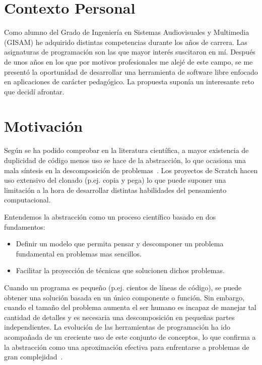 \documentclass[a4paper, 12pt]{book}
\begin{document}
\section{Contexto Personal}
\label{sec:contexto}

Como alumno del Grado de Ingeniería en Sistemas Audiovisuales y Multimedia (GISAM) he adquirido distintas competencias durante los años de carrera. Las asignaturas de programación son las que mayor interés suscitaron en mí. Después de unos años en los que por motivos profesionales me alejé de este campo, se me presentó la oportunidad de desarrollar una herramienta de software libre enfocado en aplicaciones de carácter pedagógico. La propuesta suponía un interesante reto que decidí afrontar. 

\section{Motivación}
\label{sec:motivacion}

Según se ha podido comprobar en la literatura científica, a mayor existencia de duplicidad de código menos uso se hace de la abstracción, lo que ocasiona una mala síntesis en la descomposición de problemas~\cite{baxter_yahin}. Los proyectos de Scratch hacen uso extensivo del clonado (p.ej. copia y pega) lo que puede suponer una limitación a la hora de desarrollar distintas habilidades del pensamiento computacional.

Entendemos la abstracción como un proceso científico basado en dos fundamentos:
\begin{itemize}
\item Definir un modelo que permita pensar y descomponer un problema fundamental en problemas mas sencillos.
\item Facilitar la proyección de técnicas que solucionen dichos problemas.
\end{itemize}

Cuando un programa es peque\~{n}o (p.ej. cientos de líneas de código), se puede obtener una solución basada en un único componente o función. Sin embargo, cuando el tama\~{n}o del problema aumenta el ser humano es incapaz de manejar tal cantidad de detalles y es necesaria una descomposición en peque\~{n}as partes independientes. La evolución de las herramientas de programación ha ido acompañada de un creciente uso de este conjunto de conceptos, lo que confirma a la abstracción como una aproximación efectiva para enfrentarse a problemas de gran complejidad~\cite{garridoabstraccion}.
\end{document}
